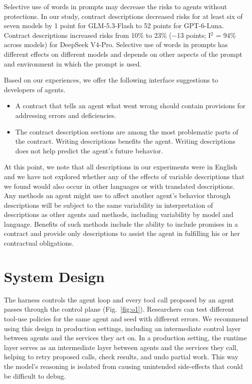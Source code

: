\documentclass[letterpaper,twocolumn,10pt]{article}
\begin{document}
Selective use of words in prompts may decrease the risks to agents without protections. In our study, contract descriptions decreased risks for at least six of seven models by 1 point for GLM-5.3-Flash to 52 points for GPT-6-Luna. Contract descriptions increased risks from 10\% to 23\% ($-$13 points; I$^2$ = 94\% across models) for DeepSeek V4-Pro. Selective use of words in prompts has different effects on different models and depends on other aspects of the prompt and environment in which the prompt is used.

Based on our experiences, we offer the following interface suggestions to developers of agents.

\begin{itemize}
\item A contract that tells an agent what went wrong should contain provisions for addressing errors and deficiencies.
\item The contract description sections are among the most problematic parts of the contract. Writing descriptions benefits the agent. Writing descriptions does not help predict the agent's future behavior.
\end{itemize}

At this point, we note that all descriptions in our experiments were in English and we have not explored whether any of the effects of variable descriptions that we found would also occur in other languages or with translated descriptions. Any methods an agent might use to affect another agent's behavior through descriptions will be subject to the same variability in interpretation of descriptions as other agents and methods, including variability by model and language. Benefits of such methods include the ability to include promises in a contract and provide only descriptions to assist the agent in fulfilling his or her contractual obligations.

\section{System Design}\label{sec:4}

The harness controls the agent loop and every tool call proposed by an agent passes through the control plane (Fig.~\ref{fig:o1}). Researchers can test different tool-use policies for the same agent and seed with different errors. We recommend using this design in production settings, including an intermediate control layer between agents and the services they act on. In a production setting, the runtime layer serves as an intermediate layer between agents and the services they call, helping to retry proposed calls, check results, and undo partial work. This way the model's reasoning is isolated from causing unintended side-effects that could be difficult to debug.
\end{document}
